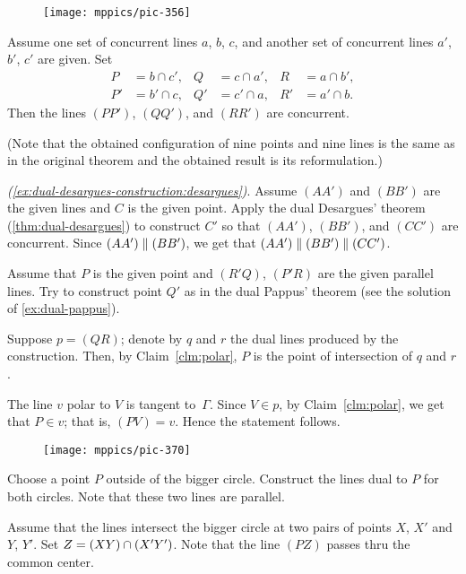 \begin{wrapfigure}{r}{36mm}
\vskip-3mm
\centering
\texttt{[image: mppics/pic-356]}
\vskip-4mm
\end{wrapfigure}

Assume one set of concurrent lines $a$, $b$, $c$, 
and another set of concurrent lines $a'$, $b'$, $c'$ are given.
Set 
\begin{align*}
P&=b\cap c',
&
Q&=c\cap a',
&
R&=a\cap b',\\
P'&=b'\cap c,
&
Q'&=c'\cap a,
&
R'&=a'\cap b.
\end{align*}
Then the lines $(PP')$, $(QQ')$, and $(RR')$ are concurrent.

(Note that the obtained configuration of nine points and nine lines is the same as in the original theorem and the obtained result is its reformulation.)

\parbf{\ref{ex:dual-desargues-construction},} \textit{(\ref{ex:dual-desargues-construction:desargues})}.
Assume $(AA')$ and $(BB')$ are the given lines and $C$ is the given point.
Apply the dual Desargues' theorem (\ref{thm:dual-desargues}) to construct $C'$ so that $(AA')$, $(BB')$, and $(CC')$ are concurrent. 
Since $(AA')\z\parallel (BB')$, 
we get that 
$(AA')\z\parallel (BB')\z\parallel (CC')$.

 Assume that $P$ is the given point and $(R'Q)$, $(P'R)$ are the given parallel lines.
Try to construct point $Q'$ as in the dual Pappus' theorem (see the solution of \ref{ex:dual-pappus}).

 Suppose $p=(QR)$; denote by $q$ and $r$ the dual lines produced by the construction. Then, by Claim~\ref{clm:polar}, $P$ is the point of intersection of $q$ and $r$.

The line $v$ polar to $V$ is tangent to~$\Gamma$.
Since $V\in p$, by Claim~\ref{clm:polar}, we get that $P\in v$;
that is, $(PV)=v$.
Hence the statement follows.

\begin{wrapfigure}{r}{45mm}
\vskip-4mm
\centering
\texttt{[image: mppics/pic-370]}
\vskip-6mm
\end{wrapfigure} 

Choose a point $P$ outside of the bigger circle.
Construct the lines dual to $P$ for both circles.
Note that these two lines are parallel. 

Assume that the lines intersect the bigger circle at two pairs of points $X$, $X'$ and $Y$, $Y'$.
Set $Z\z=(XY)\cap (X'Y')$.
Note that the line $(PZ)$ passes thru the common center.

